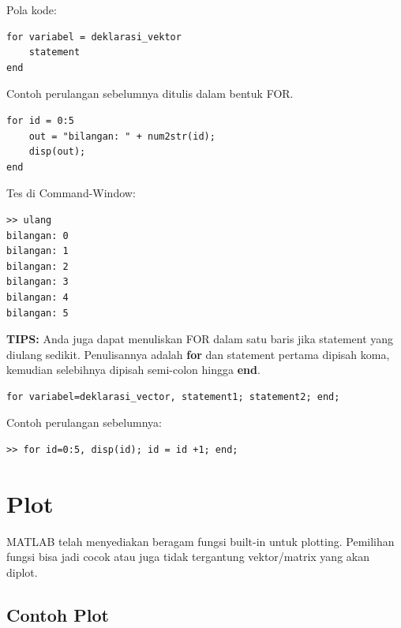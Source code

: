 \documentclass[12pt]{book}
\begin{document}
	\newpage
	Pola kode:
	\begin{verbatim}
for variabel = deklarasi_vektor
	statement
end
	\end{verbatim}

	Contoh perulangan sebelumnya ditulis dalam bentuk FOR.
	\begin{verbatim}
for id = 0:5
	out = "bilangan: " + num2str(id);
	disp(out);
end
	\end{verbatim}

	Tes di Command-Window:
	\begin{verbatim}
>> ulang
bilangan: 0
bilangan: 1
bilangan: 2
bilangan: 3
bilangan: 4
bilangan: 5
	\end{verbatim}

	\textbf{TIPS:} Anda juga dapat menuliskan FOR dalam satu baris jika statement yang diulang sedikit.
	Penulisannya adalah \textbf{for} dan statement pertama dipisah koma, kemudian selebihnya dipisah semi-colon hingga \textbf{end}.
	\begin{verbatim}
for variabel=deklarasi_vector, statement1; statement2; end;
	\end{verbatim}
	
	Contoh perulangan sebelumnya:
	\begin{verbatim}
>> for id=0:5, disp(id); id = id +1; end;
	\end{verbatim}

	\section{Plot}
	
	MATLAB telah menyediakan beragam fungsi built-in untuk plotting.
	Pemilihan fungsi bisa jadi cocok atau juga tidak tergantung vektor/matrix yang akan diplot.
	
	\subsection{Contoh Plot}
	
\end{document}
